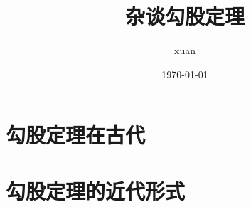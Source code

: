 \documentclass[UTF8]{ctexart}
\title{杂谈勾股定理}
\author{xuan}
\date{\today}
\begin{document}
\maketitle
\tableofcontents
\section{勾股定理在古代}
\section{勾股定理的近代形式}

\end{document}
